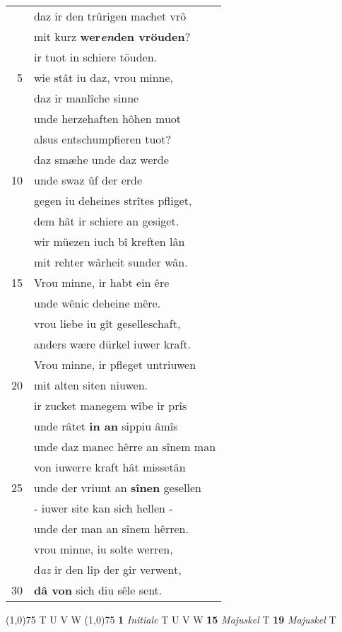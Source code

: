 \documentclass[8pt,a4paper,notitlepage]{article}
\begin{document}
\begin{table}[ht]
\begin{minipage}[t]{0.5\linewidth}
\begin{tabular}{rl}
 & daz ir den trûrigen machet vrô\\ 
 & mit kurz \textbf{wer\textit{en}den vröuden}?\\ 
 & ir tuot in schiere töuden.\\ 
5 & wie stât iu daz, vrou minne,\\ 
 & daz ir manlîche sinne\\ 
 & unde herzehaften hôhen muot\\ 
 & alsus entschumpfieren tuot?\\ 
 & daz smæhe unde daz werde\\ 
10 & unde swaz ûf der erde\\ 
 & gegen iu deheines strîtes pfliget,\\ 
 & dem hât ir schiere an gesiget.\\ 
 & wir müezen iuch bî kreften lân\\ 
 & mit rehter wârheit sunder wân.\\ 
15 & Vrou minne, ir habt ein êre\\ 
 & unde wênic deheine mêre.\\ 
 & vrou liebe iu gît geselleschaft,\\ 
 & anders wære dürkel iuwer kraft.\\ 
 & Vrou minne, ir pfleget untriuwen\\ 
20 & mit alten siten niuwen.\\ 
 & ir zucket manegem wîbe ir prîs\\ 
 & unde râtet \textbf{in an} sippiu âmîs\\ 
 & unde daz manec hêrre an sînem man\\ 
 & von iuwerre kraft hât missetân\\ 
25 & unde der vriunt an \textbf{sînen} gesellen\\ 
 & - iuwer site kan sich hellen -\\ 
 & unde der man an sînem hêrren.\\ 
 & vrou minne, iu solte werren,\\ 
 & d\textit{az} ir den lîp der gir verwent,\\ 
30 & \textbf{dâ von} sich diu sêle sent.\\ 
\end{tabular}
\scriptsize
\line(1,0){75} \newline
T U V W \newline
\line(1,0){75} \newline
\textbf{1} \textit{Initiale} T U V W  \textbf{15} \textit{Majuskel} T  \textbf{19} \textit{Majuskel} T  \newline

\end{minipage}
\end{table}
\end{document}
